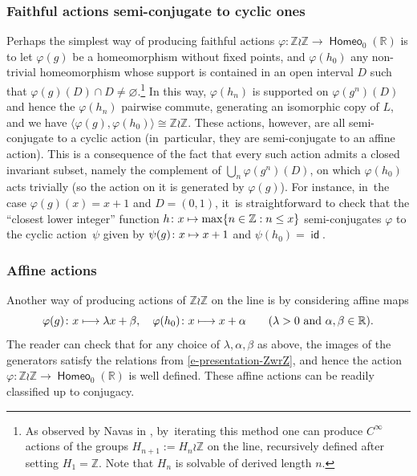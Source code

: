 \documentclass[JEP,XML,SOM,Unicode,NoFloatCountersInSection,published]{cedram}
\def\mto{\mathchoice{\longmapsto}{\mapsto}{\mapsto}{\mapsto}}
\theoremstyle{definition}
\DeclareMathOperator{\homeo}{\mathsf{Homeo}}
\DeclareMathOperator{\id}{\mathsf{id}}
\newcommand{\R}{\mathbb{R}}
\newcommand{\Z}{\mathbb Z}
\begin{document}
\subsubsection{Faithful actions semi-conjugate to cyclic ones} \label{s-cyclic-lamplighter}
Perhaps the simplest way of producing faithful actions $\varphi\colon\Z\wr\Z\to \homeo_0(\R)$ is to let $\varphi(g)$ be a homeomorphism without fixed points, and $\varphi(h_0)$ any non-trivial homeomorphism whose support is contained in an open interval $D$ such that $\varphi(g)(D)\cap D\neq \varnothing$.\footnote{As observed by Navas in \cite{NavasResolubles}, by~iterating this method one can produce $C^\infty$ actions of the groups $H_{n+1}:=H_n\wr \Z$ on the line, recursively defined after setting $H_1=\Z$. Note that $H_n$ is solvable of derived length $n$.} In this way, $\varphi(h_n)$ is supported on $\varphi(g^n)(D)$ and hence the $\varphi(h_n)$ pairwise commute, generating an isomorphic copy of $L$, and we have $\langle \varphi(g),\varphi(h_0)\rangle\cong \Z\wr\Z$. These actions, however, are all semi-conjugate to a cyclic action (in~particular, they are semi-conjugate to an affine action). This is a consequence of the fact that every such action admits a closed invariant subset, namely the complement of $\bigcup_n \varphi(g^n)(D)$, on which $\varphi(h_0)$ acts trivially (so the action on it is generated by $\varphi(g)$).
For instance, in~the case $\varphi(g)(x)=x+1$ and $D=(0,1)$, it~is straightforward to check that the ``closest lower integer'' function $h\colon x\mto\max \{n\in \Z:n\le x\}$ semi-conjugates $\varphi$ to the cyclic action~$\psi$ given by $\psi(g)\colon x\mto x+1$ and $\psi(h_0)=\id$.

\subsubsection{Affine actions}
Another way of producing actions of $\Z\wr\Z$ on the line is by considering affine maps
\[\varphi(g) \colon x\mto \lambda x+\beta , \quad \varphi(h_0)\colon x\mto x+ \alpha \quad \quad (\lambda>0\text{ and } \alpha, \beta \in\R).
\]
The reader can check that for any choice of $\lambda,\alpha,\beta$ as above, the images of the generators satisfy the relations from \eqref{e-presentation-ZwrZ}, and hence the action $\varphi\colon\Z\wr\Z\to \homeo_0(\R)$ is well defined. These affine actions can be readily classified up to conjugacy.
\end{document}
